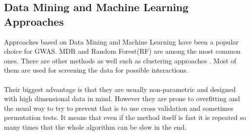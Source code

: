 \documentclass[10pt,a4paper]{report}
\begin{document}
\subsection{Data Mining and Machine Learning Approaches}
\label{data_machine_learning}
Approaches based on Data Mining and Machine Learning have been a popular choice for GWAS. MDR\cite{mdr_2001} and Random Forest(RF)\cite{random_forest} are among the most common ones\cite{gene_enviroment_2013,cordell_detect_review}. There are other methods as well such as clustering approaches \cite{fast_high_order_cluster}. Most of them are used for screening the data for possible interactions\cite{gene_enviroment_2013,cordell_detect_review}.\\
\\
Their biggest advantage is that they are usually non-parametric and designed with high dimensional data in mind. However they are prone to overfitting and the usual way to try to prevent that is to use cross validation and sometimes permutation tests. It means that even if the method itself is fast it is repeated so many times that the whole algorithm can be slow in the end.\cite{cordell_detect_review}
\end{document}
